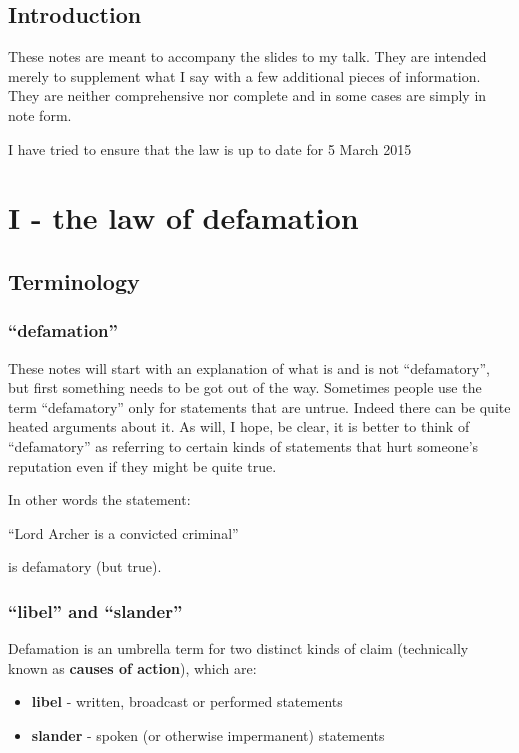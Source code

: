 \documentclass[]{article}
\date{}
\begin{document}
\subsection{Introduction}

These notes are meant to accompany the slides to my talk. They are intended merely to supplement what I say with a few additional pieces of information. They are neither comprehensive nor complete and in some cases are simply in note form.

I have tried to ensure that the law is up to date for 5 March 2015

\section{I - the law of defamation}

\subsection{Terminology}

\subsubsection{\texorpdfstring{``defamation''}{defamation}}

These notes will start with an explanation of what is and is not ``defamatory'', but first something needs to be got out of the way. Sometimes people use the term ``defamatory'' only for statements that are untrue. Indeed there can be quite heated arguments about it. As will, I hope, be clear, it is better to think of ``defamatory'' as referring to certain kinds of statements that hurt someone's reputation even if they might be quite true. 

In other words the statement:

``Lord Archer is a convicted criminal''

is defamatory (but true).

\subsubsection{\texorpdfstring{``libel'' and
``slander''}{libel and slander}}

Defamation is an umbrella term for two distinct kinds of claim
(technically known as \textbf{causes of action}{), which are:}

\begin{itemize}
\item
  \textbf{libel}{ - written, broadcast or performed statements}
\item
  \textbf{slander}{ - spoken (or otherwise impermanent) statements}
\end{itemize}
\end{document}
